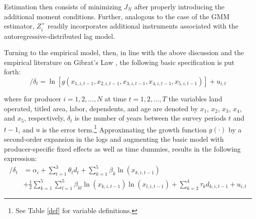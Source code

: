 \documentclass[english]{article}
\begin{document}
\noindent
Estimation then consists of minimizing $J_N$ after properly introducing the additional moment conditions. Further, analogous to the case of the \citeauthor{arellano1991} GMM estimator, $Z_{i}^{+}$ readily incorporates additional instruments associated with the autoregressive-distributed lag model.

Turning to the empirical model, then, in line with the above discussion and the empirical literature on Gibrat's Law \citep{evans1987, sleuwaegen2002, rizov2003, dries2004b}, the following basic specification is put forth:
\begin{equation}
[\ln(x_{1,i,t}) - \ln(x_{1,i,t-1})]/\delta_t = \ln [g(x_{1,i,t-1}, x_{2,i,t-1}, x_{3,i,t-1}, x_{4,i,t-1}, x_{5,i,t-1})] + u_{i,t}
\end{equation}

\noindent
where for producer $i=1,2,\ldots,N$ at time $t=1,2,\ldots,T$ the variables land operated, titled area, labor, dependents, and age are denoted by $x_{1}$, $x_{2}$, $x_{3}$, $x_{4}$, and $x_{5}$, respectively, $\delta_t$ is the number of years between the survey periods $t$ and $t-1$, and $u$ is the error term.\footnote{See Table \ref{def} for variable definitions.} Approximating the growth function $g(\cdot)$ by a second-order expansion in the logs and augmenting the basic model with producer-specific fixed effects as well as time dummies, results in the following expression:
\begin{align}
[\ln(x_{1,i,t}) - \ln(x_{1,i,t-1})]/\delta_t & = \alpha_i + \sum_{t=1}^{3}\theta_t d_t +\sum_{k=1}^{5}\beta_k \ln (x_{k,i,t-1})\nonumber\\
& +\frac{1}{2}\sum_{k=1}^{5}\sum_{l=1}^{5}\beta_{kl}\ln (x_{k,i,t-1})\ln (x_{l,i,t-1})
+\sum_{k=2}^{4}\tau_k d_{k,i,t-1}+u_{i,t}
\label{emodel}
\end{align}
\end{document}
